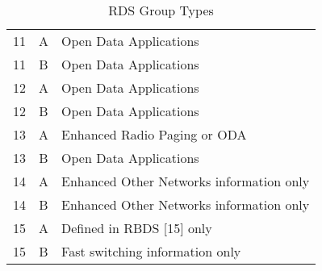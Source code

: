 \begin{table}
\begin{center}
\begin{tabular}{ c c l }
		11 & A & Open Data Applications\\
		11 & B & Open Data Applications\\
		12 & A & Open Data Applications\\
		12 & B & Open Data Applications\\
		13 & A & Enhanced Radio Paging or ODA\\
		13 & B & Open Data Applications\\
		14 & A & Enhanced Other Networks information only \\
		14 & B & Enhanced Other Networks information only \\
		15 & A & Defined in RBDS [15] only\\
		15 & B & Fast switching information only \\\hline
		\end{tabular}
		\caption{RDS Group Types}
		\label{tab:rds_groups}
	\end{center}
\end{table}


